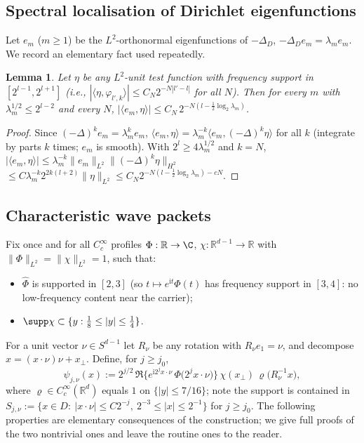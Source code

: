 \documentclass[11pt]{amsart}
\newtheorem{lemma}[theorem]{Lemma}
\newcommand{\R}{\mathbb{R}}
\newcommand{\1}{\mathbf{1}}
\begin{document}
\subsection{Spectral localisation of Dirichlet eigenfunctions}
Let $e_m$ ($m\ge1$) be the $L^2$-orthonormal eigenfunctions of $-\Delta_D$,
$-\Delta_De_m=\lambda_m e_m$. We record an elementary fact used repeatedly.

\begin{lemma}\label{lem:eig}
Let $\eta$ be any $L^2$-unit test function with frequency support in
$[2^{l-1},2^{l+1}]$ (i.e., $|\langle \eta,\varphi_{l',k}\rangle|\le
C_N2^{-N|l'-l|}$ for all $N$). Then for every $m$ with
$\lambda_m^{1/2}\le 2^{l-2}$ and every $N$,
$|\langle e_m,\eta\rangle|\le C_N\,2^{-N(l-\frac12\log_2\lambda_m)}$.
\end{lemma}

\begin{proof}
Since $(-\Delta)^k e_m=\lambda_m^k e_m$,
$\langle e_m,\eta\rangle=\lambda_m^{-k}\langle e_m,(-\Delta)^k\eta\rangle$
for all $k$ (integrate by parts $k$ times; $e_m$ is smooth). With
$2^l\ge4\lambda_m^{1/2}$ and $k=N$,
$|\langle e_m,\eta\rangle|\le\lambda_m^{-k}\|e_m\|_{L^2}\|(-\Delta)^k\eta\|_{H^2}$
$\le C\lambda_m^{-k}2^{2k(l+2)}\|\eta\|_{L^2}\le C_N2^{-N(l-\frac12\log_2\lambda_m)-cN}$.
\end{proof}

\subsection{Characteristic wave packets}

Fix once and for all $C^\infty_c$ profiles
$\Phi:\R\to\C$, $\chi:\R^{d-1}\to\R$ with $\|\Phi\|_{L^2}=\|\chi\|_{L^2}=1$,
such that:
\begin{itemize}
\item $\widehat\Phi$ is supported in $[2,3]$ (so $t\mapsto e^{\mathrm{i}t}\Phi(t)$
has frequency support in $[3,4]$: no low-frequency content near the carrier);
\item $\supp\chi\subset\{y:\tfrac18\le|y|\le\tfrac14\}$.
\end{itemize}
For a unit vector $\nu\in S^{d-1}$ let $R_\nu$ be any rotation with
$R_\nu e_1=\nu$, and decompose $x=(x\cdot\nu)\nu+x_\perp$. Define, for
$j\ge j_0$,
\begin{equation}\label{eq:packet}
\psi_{j,\nu}(x)
:=2^{j/2}\,\Re\Big\{e^{\mathrm{i}2^j x\cdot\nu}\,
\Phi\big(2^j x\cdot\nu\big)\Big\}\,
\chi(x_\perp)\,\varrho\big(R_\nu^{-1}x\big),
\end{equation}
where $\varrho\in C^\infty_c(\R^d)$ equals $1$ on $\{|y|\le 7/16\}$; note the
support is contained in
$S_{j,\nu}:=\{x\in D:\ |x\cdot\nu|\le C2^{-j},\ 2^{-3}\le |x|\le2^{-1}\}$
for $j\ge j_0$. The following properties are elementary consequences of the
construction; we give full proofs of the two nontrivial ones and leave the
routine ones to the reader.
\end{document}
